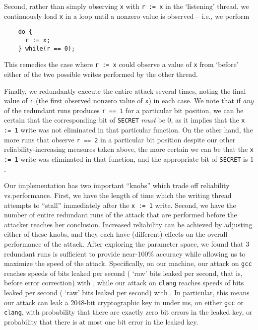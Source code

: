 Second, rather than simply observing \verb|x| with \verb|r := x| in the
`listening' thread, we continuously load \verb|x| in a loop until a
nonzero value is observed -- i.e., we perform
\begin{verbatim}
    do {
      r := x;
    } while(r == 0);
\end{verbatim}
This remedies the case where \verb|r := x| could observe a value of \verb|x|
from `before' either of the two possible writes performed by the other thread.

Finally, we redundantly execute the entire attack several times, noting the
final value of \verb|r| (the first observed nonzero value of \verb|x|) in each
case.
We note that if \emph{any} of the redundant runs produces \verb|r == 1| for a
particular bit position, we can be certain that the corresponding bit of
\verb|SECRET| \emph{must} be $0$, as it implies that the \verb|x := 1| write
was not eliminated in that particular function.
On the other hand, the more runs that observe \verb|r == 2| in a particular bit
position despite our other reliability-increasing measures taken above, the
more certain we can be that the \verb|x := 1| write was eliminated in that
function, and the appropriate bit of \verb|SECRET| is $1$.

Our implementation has two important ``knobs'' which trade off reliability
vs.\@ performance.
First, we have the length of time which the writing thread attempts to
``stall'' immediately after the \verb|x := 1| write.
Second, we have the number of entire redundant runs of the attack that are
performed before the attacker reaches her conclusion.
Increased reliability can be achieved by adjusting either of these knobs,
and they each have (different) effects on the overall performance of the
attack.
After exploring the parameter space, we found that $3$ redundant runs is
sufficient to provide near-100\% accuracy while allowing us to maximize the
speed of the attack.
Specifically, on our machine, our attack on \verb|gcc| reaches speeds of
 bits leaked per second
( `raw' bits leaked per second, that is, before
error correction) with , while our attack on
\verb|clang| reaches speeds of  bits leaked per
second ( `raw' bits leaked per second) with
.
In particular, this means our attack can leak a 2048-bit cryptographic key in
under  ms, on either \verb|gcc| or \verb|clang|, with
probability  that there are exactly zero bit errors in
the leaked key, or probability  that there is at most
one bit error in the leaked key.
